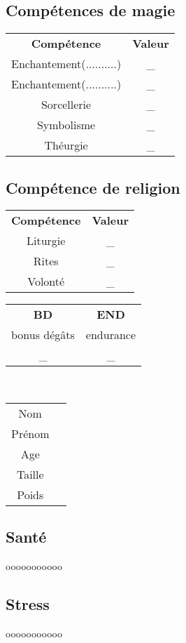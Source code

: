 \documentclass[10pt,a4paper]{article}
\begin{document}
\begin{multicols}{3}
  \subsection*{Compétences de magie}
  \begin{tabular}{cc}
  \textbf{Compétence}& \textbf{Valeur}\\
  Enchantement(..........)& \_\\
  Enchantement(..........)& \_\\
  Sorcellerie& \_\\
  Symbolisme& \_\\
  Théurgie& \_\\
  \end{tabular}
  \subsection*{Compétence de religion}
  \begin{tabular}{cc}
  \textbf{Compétence}& \textbf{Valeur}\\
  Liturgie& \_\\
  Rites& \_\\
  Volonté& \_\\
  \end{tabular}
  \columnbreak
  
  \begin{tabular}{cc}
  \textbf{BD} & \textbf{END} \\
  \small bonus dégâts & \small endurance\\
  \_ & \_ 
  \end{tabular}
  \\
  \begin{tabular}{cc}
  Nom &\\
  Prénom &\\
  Age &\\
  Taille &\\
  Poids &\\
  \end{tabular}
  
  \subsection*{Santé}
  \centering
  ooooooooooo
  \subsection*{Stress}
  \centering
  ooooooooooo

\end{multicols}
\end{document}
